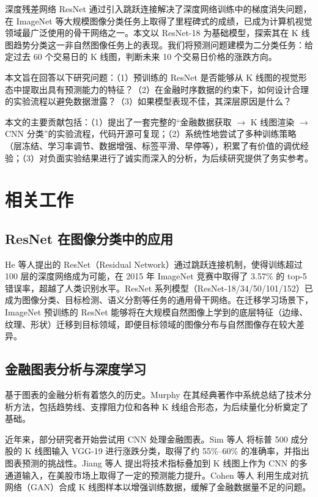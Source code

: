 \documentclass[12pt,a4paper]{ctexart}
\begin{document}
深度残差网络 ResNet\cite{he2016deep} 通过引入跳跃连接解决了深度网络训练中的梯度消失问题，在 ImageNet 等大规模图像分类任务上取得了里程碑式的成绩，已成为计算机视觉领域最广泛使用的骨干网络之一。本文以 ResNet-18 为基础模型，探索其在 K 线图趋势分类这一非自然图像任务上的表现。我们将预测问题建模为二分类任务：给定过去 60 个交易日的 K 线图，判断未来 10 个交易日价格的涨跌方向。

本文旨在回答以下研究问题：（1）预训练的 ResNet 是否能够从 K 线图的视觉形态中提取出具有预测能力的特征？（2）在金融时序数据的约束下，如何设计合理的实验流程以避免数据泄露？（3）如果模型表现不佳，其深层原因是什么？

本文的主要贡献包括：（1）提出了一套完整的``金融数据获取 $\rightarrow$ K 线图渲染 $\rightarrow$ CNN 分类''的实验流程，代码开源可复现；（2）系统性地尝试了多种训练策略（层冻结、学习率调节、数据增强、标签平滑、早停等），积累了有价值的调优经验；（3）对负面实验结果进行了诚实而深入的分析，为后续研究提供了务实参考。

\section{相关工作}

\subsection{ResNet 在图像分类中的应用}

He 等人\cite{he2016deep}提出的 ResNet（Residual Network）通过跳跃连接机制，使得训练超过 100 层的深度网络成为可能，在 2015 年 ImageNet 竞赛中取得了 3.57\% 的 top-5 错误率，超越了人类识别水平。ResNet 系列模型（ResNet-18/34/50/101/152）已成为图像分类、目标检测、语义分割等任务的通用骨干网络。在迁移学习场景下，ImageNet 预训练的 ResNet 能够将在大规模自然图像上学到的底层特征（边缘、纹理、形状）迁移到目标领域，即便目标领域的图像分布与自然图像存在较大差异\cite{yosinski2014transferable}。

\subsection{金融图表分析与深度学习}

基于图表的金融分析有着悠久的历史。Murphy\cite{murphy1999technical} 在其经典著作中系统总结了技术分析方法，包括趋势线、支撑阻力位和各种 K 线组合形态，为后续量化分析奠定了基础。

近年来，部分研究者开始尝试用 CNN 处理金融图表。Sim 等人\cite{sim2019deep} 将标普 500 成分股的 K 线图输入 VGG-19 进行涨跌分类，取得了约 55\%--60\% 的准确率，并指出图表预测的挑战性。Jiang 等人\cite{jiang2023re} 提出将技术指标叠加到 K 线图上作为 CNN 的多通道输入，在美股市场上取得了一定的预测能力提升。Cohen 等人\cite{cohen2022candlestick} 利用生成对抗网络（GAN）合成 K 线图样本以增强训练数据，缓解了金融数据量不足的问题。
\end{document}
